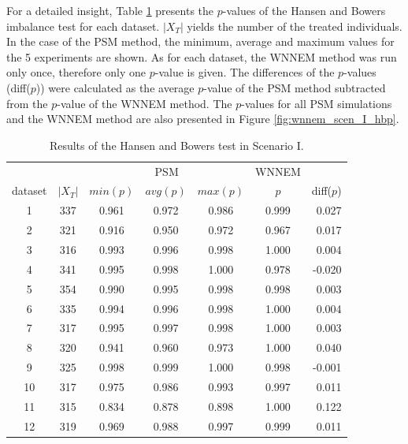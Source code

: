 		For a detailed insight, Table \ref{tab:wnnem_scen_I_stat_separated} presents the $p$-values of the Hansen and Bowers imbalance test for each dataset. $|X_T|$ yields the number of the treated individuals. In the case of the PSM method, the minimum, average and maximum values for the 5 experiments are shown. As for each dataset, the WNNEM method was run only once, therefore only one $p$-value is given. The differences of the $p$-values (diff($p$)) were calculated as the average $p$-value of the PSM method subtracted from the $p$-value of the WNNEM method. 
		The $p$-values for all PSM simulations and the WNNEM method are also presented in Figure \ref{fig:wnnem_scen_I_hbp}.   
										
		\begin{table}[h]
			\caption{Results of the Hansen and Bowers test in Scenario I.}
			\label{tab:wnnem_scen_I_stat_separated}
			\centering
			\begin{tabular}{ccccccr} 
				\toprule
				& & \multicolumn{3}{c}{PSM}
				& WNNEM & \\
				dataset & $|X_T|$ & $min (p)$ & $avg (p)$ & $max (p)$ & $p$   & diff($p$) \\
				\midrule
				1       & 337     & 0.961     & 0.972     & 0.986     & 0.999 & 0.027     \\
				2       & 321     & 0.916     & 0.950     & 0.972     & 0.967 & 0.017     \\
				3       & 316     & 0.993     & 0.996     & 0.998     & 1.000 & 0.004     \\
				4       & 341     & 0.995     & 0.998     & 1.000     & 0.978 & -0.020    \\
				5       & 354     & 0.990     & 0.995     & 0.998     & 0.998 & 0.003     \\
				6       & 335     & 0.994     & 0.996     & 0.998     & 1.000 & 0.004     \\
				7       & 317     & 0.995     & 0.997     & 0.998     & 1.000 & 0.003     \\
				8       & 320     & 0.941     & 0.960     & 0.973     & 1.000 & 0.040     \\
				9       & 325     & 0.998     & 0.999     & 1.000     & 0.998 & -0.001    \\
				10      & 317     & 0.975     & 0.986     & 0.993     & 0.997 & 0.011     \\
				11      & 315     & 0.834     & 0.878     & 0.898     & 1.000 & 0.122     \\
				12      & 319     & 0.969     & 0.988     & 0.997     & 0.999 & 0.011     \\

\end{tabular}
\end{table}
